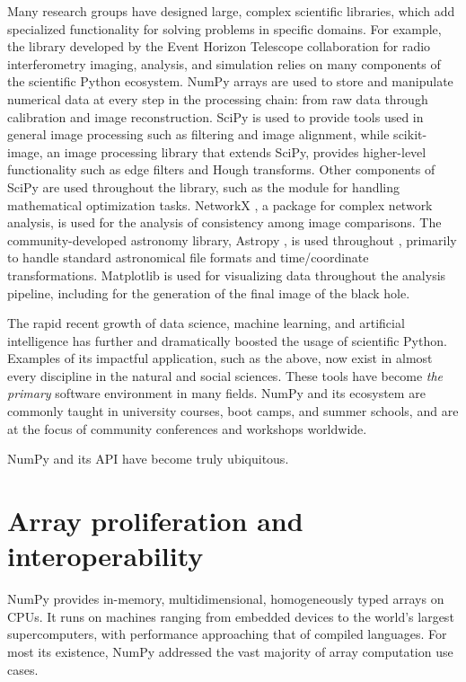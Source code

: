 Many research groups have designed large,
complex scientific libraries, which add specialized functionality for
solving problems in specific domains.
For example, the  library developed by the Event Horizon Telescope 
collaboration for radio interferometry imaging, analysis, and simulation
relies on many components of the scientific Python ecosystem.
NumPy arrays are used to store and manipulate numerical data at every step
in the processing chain: from raw data through calibration and image
reconstruction.
SciPy is used to provide tools used in general image processing such as
filtering and image alignment, while scikit-image, an image processing
library that extends SciPy, provides higher-level functionality such as
edge filters and Hough transforms.
Other components of SciPy are used throughout the library, such as the
 module for handling mathematical optimization tasks.
NetworkX \cite{SciPyProceedings_11}, a package for complex
network analysis, is used for the analysis of consistency among image
comparisons.
The community-developed astronomy library, Astropy \cite{astropy:2013, astropy:2018},
is used throughout , primarily to handle standard
astronomical file formats and time/coordinate transformations.
Matplotlib is used for visualizing data throughout the analysis pipeline,
including for the generation of the final image of the black hole.

The rapid recent growth of data science, machine learning, and
artificial intelligence has further and dramatically boosted the usage of
scientific Python.  Examples of its impactful application, such as the
above, now exist in almost every discipline in the natural and social
sciences.  These tools have become \emph{the
primary} software environment in many fields.  NumPy and its ecosystem are commonly
taught in university courses, boot camps, and summer schools, and are
at the focus of community conferences and workshops worldwide.

NumPy and its API have become truly ubiquitous.

\section*{Array proliferation and interoperability}

NumPy provides in-memory, multidimensional, homogeneously typed
arrays on CPUs.  It runs on machines
ranging from embedded devices to the world's largest supercomputers,
with performance approaching that of compiled languages.  For
most its existence, NumPy addressed the vast majority of
array computation use cases.

